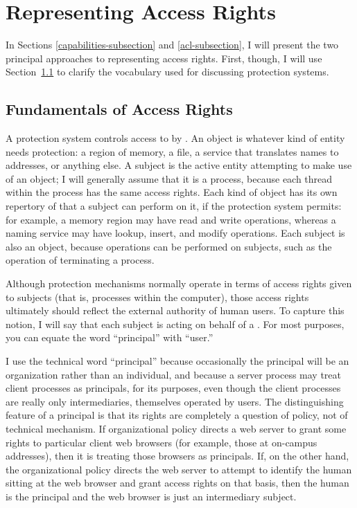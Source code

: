 \section{Representing Access Rights}\label{access-rights-section}

In Sections \ref{capabilities-subsection} and \ref{acl-subsection}, I will present the two principal
approaches to representing access rights.  First, though, I will
use Section~\ref{access-fundamentals-subsections} to clarify the vocabulary used for discussing
protection systems.

\subsection{Fundamentals of Access Rights}\label{access-fundamentals-subsections}

A protection system controls access to  by
.  An object is whatever kind of entity needs
protection: a region of memory, a file, a service that translates
names to addresses, or anything else.  
A subject is the active entity
attempting to make use of an object; I will generally assume that it is
a process, because each thread within the process has the same access
rights.
Each kind of object has its own
repertory of  that a subject can perform on it, if
the protection system permits: for example, a memory region may have
read and write operations, whereas a naming service may have lookup,
insert, and modify operations.  Each subject is also an object,
because operations can be performed on subjects, such as the operation
of terminating a process.

Although protection mechanisms normally operate in terms of access
rights given to subjects (that is, processes within the computer), those
access rights ultimately should reflect the external authority of
human users.  To capture this notion, I will say that each subject is
acting on behalf of a . For most purposes, you can
equate the word ``principal'' with ``user.''

I use the technical word ``principal'' because occasionally the
principal will be an organization rather than an individual, and
because a server process may treat client processes as principals, for
its purposes, even though the client processes are really only
intermediaries, themselves operated by users.  The distinguishing
feature of a principal is that its rights are completely a question of
policy, not of technical mechanism.  If organizational policy directs
a web server to grant some rights to particular client web browsers
(for example, those at on-campus addresses), then it is treating those
browsers as principals.  If, on the other hand, the organizational
policy directs the web server to attempt to identify the human sitting
at the web browser and grant access rights on that basis, then the
human is the principal and the web browser is just an intermediary
subject.

